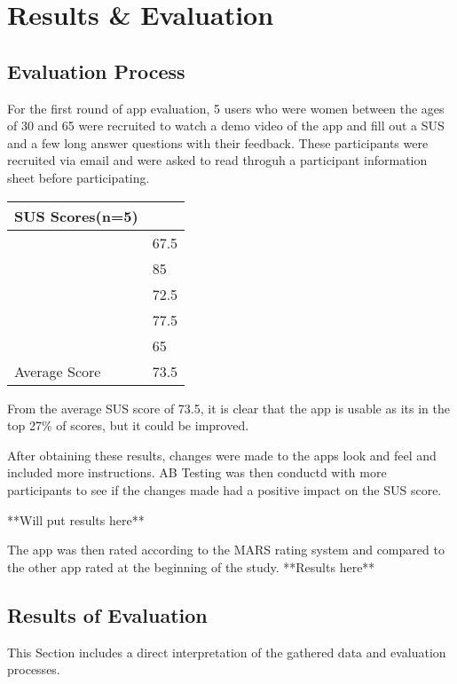 \section{Results \& Evaluation}\label{results}


\subsection{Evaluation Process}
For the first round of app evaluation, 5 users who were women between the ages of 30 and 65 were recruited to watch a demo video of the app and fill out a SUS and a few long answer questions with their feedback. These participants were recruited via email and were asked to read throguh a participant information sheet before participating.

\begin{table}[h!!]
    \begin{tabular}{ll}
    \hline
    SUS Scores(n=5) &      \\ \hline
                    & 67.5 \\
                    & 85   \\
                    & 72.5 \\
                    & 77.5 \\
                    & 65   \\
        Average Score & 73.5
    \end{tabular}
    \end{table}

From the average SUS score of 73.5, it is clear that the app is usable as its in the top 27\% of scores, but it could be improved.

After obtaining these results, changes were made to the apps look and feel and included more instructions. AB Testing was then conductd with more participants to see if the changes made had a positive impact on the SUS score. 

**Will put results here** 

The app was then rated according to the MARS rating system and compared to the other app rated at the beginning of the study. **Results here** 

\subsection{Results of Evaluation}
This Section includes a direct interpretation of the gathered data and evaluation processes. 


